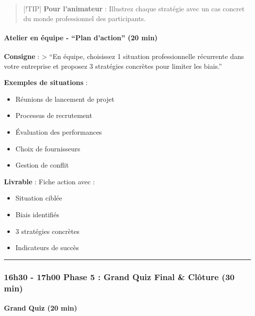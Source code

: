 \documentclass[
]{article}
\providecommand{\tightlist}{%
  \setlength{\itemsep}{0pt}\setlength{\parskip}{0pt}}
\begin{document}
\begin{quote}
{[}!TIP{]} \textbf{Pour l'animateur} : Illustrez chaque stratégie avec
un cas concret du monde professionnel des participants.
\end{quote}

\paragraph{Atelier en équipe - ``Plan d'action'' (20
min)}\label{atelier-en-uxe9quipe---plan-daction-20-min}

\textbf{Consigne} : \textgreater{} ``En équipe, choisissez 1 situation
professionnelle récurrente dans votre entreprise et proposez 3
stratégies concrètes pour limiter les biais.''

\textbf{Exemples de situations} :

\begin{itemize}
\tightlist
\item
  Réunions de lancement de projet
\item
  Processus de recrutement
\item
  Évaluation des performances
\item
  Choix de fournisseurs
\item
  Gestion de conflit
\end{itemize}

\textbf{Livrable} : Fiche action avec :

\begin{itemize}
\tightlist
\item
  Situation ciblée
\item
  Biais identifiés
\item
  3 stratégies concrètes
\item
  Indicateurs de succès
\end{itemize}

\begin{center}\rule{0.5\linewidth}{0.5pt}\end{center}

\subsubsection{\texorpdfstring{\textbf{16h30 - 17h00 \textbar{} Phase 5
: Grand Quiz Final \& Clôture (30
min)}}{16h30 - 17h00 \textbar{} Phase 5 : Grand Quiz Final \& Clôture (30 min)}}\label{h30---17h00-phase-5-grand-quiz-final-cluxf4ture-30-min}

\paragraph{Grand Quiz (20 min)}\label{grand-quiz-20-min}
\end{document}
